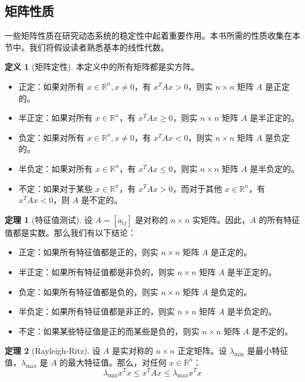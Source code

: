 \documentclass[UTF8,12pt,a4paper]{ctexart}
\theoremstyle{definition}
\newtheorem{definition}{定义}[section]
\newtheorem{theorem}{定理}[section]
\begin{document}
\subsection{矩阵性质}

一些矩阵性质在研究动态系统的稳定性中起着重要作用。本书所需的性质收集在本节中。我们将假设读者熟悉基本的线性代数。

\begin{definition}[矩阵定性]
本定义中的所有矩阵都是实方阵。
\begin{itemize}
\item 正定：如果对所有 $x \in \mathbb{R}^n, x \neq 0$，有 $x^T A x > 0$，则实 $n \times n$ 矩阵 $A$ 是正定的。
\item 半正定：如果对所有 $x \in \mathbb{R}^n$，有 $x^T A x \geq 0$，则实 $n \times n$ 矩阵 $A$ 是半正定的。
\item 负定：如果对所有 $x \in \mathbb{R}^n, x \neq 0$，有 $x^T A x < 0$，则实 $n \times n$ 矩阵 $A$ 是负定的。
\item 半负定：如果对所有 $x \in \mathbb{R}^n$，有 $x^T A x \leq 0$，则实 $n \times n$ 矩阵 $A$ 是半负定的。
\item 不定：如果对于某些 $x \in \mathbb{R}^n$，有 $x^T A x > 0$，而对于其他 $x \in \mathbb{R}^n$，有 $x^T A x < 0$，则 $A$ 是不定的。
\end{itemize}
\end{definition}

\begin{theorem}[特征值测试]
设 $A=[a_{ij}]$ 是对称的 $n \times n$ 实矩阵。因此，$A$ 的所有特征值都是实数。那么我们有以下结论：
\begin{itemize}
\item 正定：如果所有特征值都是正的，则实 $n \times n$ 矩阵 $A$ 是正定的。
\item 半正定：如果所有特征值都是非负的，则实 $n \times n$ 矩阵 $A$ 是半正定的。
\item 负定：如果所有特征值都是负的，则实 $n \times n$ 矩阵 $A$ 是负定的。
\item 半负定：如果所有特征值都是非正的，则实 $n \times n$ 矩阵 $A$ 是半负定的。
\item 不定：如果某些特征值是正的而某些是负的，则实 $n \times n$ 矩阵 $A$ 是不定的。
\end{itemize}
\end{theorem}

\begin{theorem}[Rayleigh-Ritz]
设 $A$ 是实对称的 $n \times n$ 正定矩阵。设 $\lambda_{\min}$ 是最小特征值，$\lambda_{\max}$ 是 $A$ 的最大特征值。那么，对任何 $x \in \mathbb{R}^n$：
\[
\lambda_{\min} x^T x \leq x^T A x \leq \lambda_{\max} x^T x
\]
\end{theorem}
\end{document}
